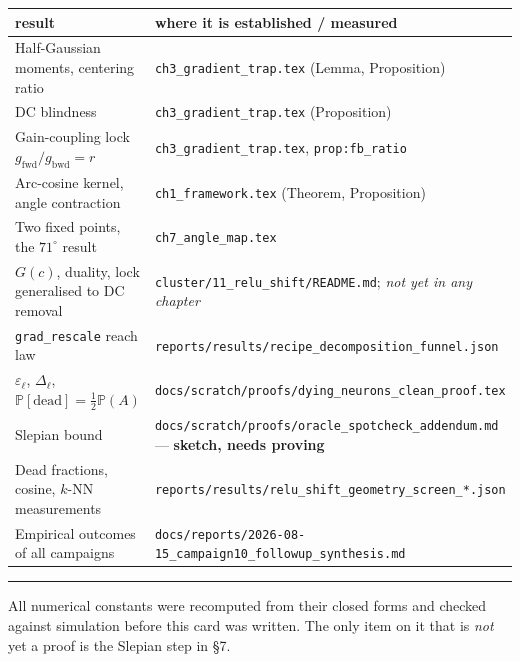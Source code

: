 \documentclass[10pt,a4paper]{article}
\newcommand{\gfwd}{g_{\mathrm{fwd}}}
\newcommand{\gbwd}{g_{\mathrm{bwd}}}
\newcommand{\rr}{r}
\begin{document}
\begin{center}\small
\begin{tabular}{@{}p{55mm}p{105mm}@{}}
\toprule
result & where it is established / measured \\
\midrule
Half-Gaussian moments, centering ratio & \texttt{ch3\_gradient\_trap.tex} (Lemma, Proposition) \\
DC blindness & \texttt{ch3\_gradient\_trap.tex} (Proposition) \\
Gain-coupling lock $\gfwd/\gbwd=\rr$ & \texttt{ch3\_gradient\_trap.tex}, \texttt{prop:fb\_ratio} \\
Arc-cosine kernel, angle contraction & \texttt{ch1\_framework.tex} (Theorem, Proposition) \\
Two fixed points, the $71^\circ$ result & \texttt{ch7\_angle\_map.tex} \\
$G(c)$, duality, lock generalised to DC removal & \texttt{cluster/11\_relu\_shift/README.md}; \emph{not yet in any chapter} \\
\texttt{grad\_rescale} reach law & \texttt{reports/results/recipe\_decomposition\_funnel.json} \\
$\varepsilon_\ell$, $\Delta_\ell$, $\mathbb P[\text{dead}]=\tfrac12\mathbb P(A)$ & \texttt{docs/scratch/proofs/dying\_neurons\_clean\_proof.tex} \\
Slepian bound & \texttt{docs/scratch/proofs/oracle\_spotcheck\_addendum.md} --- \textbf{sketch, needs proving} \\
Dead fractions, cosine, $k$-NN measurements & \texttt{reports/results/relu\_shift\_geometry\_screen\_*.json} \\
Empirical outcomes of all campaigns & \texttt{docs/reports/2026-08-15\_campaign10\_followup\_synthesis.md} \\
\bottomrule
\end{tabular}
\end{center}

\vspace{2mm}\hrule\vspace{1.5mm}
{\footnotesize All numerical constants were recomputed from their closed forms and checked against
simulation before this card was written. The only item on it that is \emph{not} yet a proof is the
Slepian step in §7.}
\end{document}
